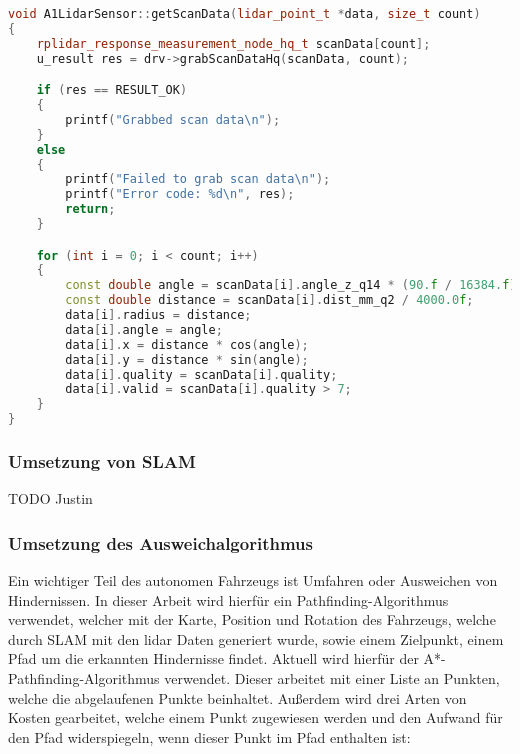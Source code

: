 \begin{lstlisting}[caption={Auslesen der LiDAR Daten},label={lst:auslesen_lidar},language={C++}]
void A1LidarSensor::getScanData(lidar_point_t *data, size_t count)
{
    rplidar_response_measurement_node_hq_t scanData[count];
    u_result res = drv->grabScanDataHq(scanData, count);

    if (res == RESULT_OK)
    {
        printf("Grabbed scan data\n");
    }
    else
    {
        printf("Failed to grab scan data\n");
        printf("Error code: %d\n", res);
        return;
    }

    for (int i = 0; i < count; i++)
    {
        const double angle = scanData[i].angle_z_q14 * (90.f / 16384.f);
        const double distance = scanData[i].dist_mm_q2 / 4000.0f;
        data[i].radius = distance;
        data[i].angle = angle;
        data[i].x = distance * cos(angle);
        data[i].y = distance * sin(angle);
        data[i].quality = scanData[i].quality;
        data[i].valid = scanData[i].quality > 7;
    }
}
\end{lstlisting}

\subsubsection{Umsetzung von SLAM}
\label{slamImplementierung}

TODO Justin

\subsubsection{Umsetzung des Ausweichalgorithmus}

Ein wichtiger Teil des autonomen Fahrzeugs ist Umfahren oder Ausweichen von Hindernissen. In dieser Arbeit wird hierfür ein Pathfinding-Algorithmus verwendet, welcher mit der Karte, Position und Rotation des Fahrzeugs, welche durch SLAM mit den \ac{lidar} Daten generiert wurde, sowie einem Zielpunkt, einem Pfad um die erkannten Hindernisse findet. Aktuell wird hierfür der A*-Pathfinding-Algorithmus verwendet. Dieser arbeitet mit einer Liste an Punkten, welche die abgelaufenen Punkte beinhaltet. Außerdem wird drei Arten von Kosten gearbeitet, welche einem Punkt zugewiesen werden und den Aufwand für den Pfad widerspiegeln, wenn dieser Punkt im Pfad enthalten ist:

